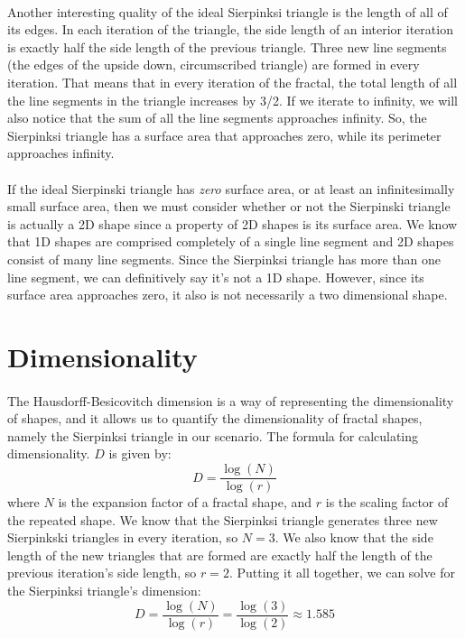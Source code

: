 \documentclass{article}
\begin{document}
\paragraph{}
Another interesting quality of the ideal Sierpinksi triangle is the length of all of its edges. In each iteration of the triangle, the side length of an interior iteration is exactly half the side length of the previous triangle. Three new line segments (the edges of the upside down, circumscribed triangle) are formed in every iteration. That means that in every iteration of the fractal, the total length of all the line segments in the triangle increases by 3/2. If we iterate to infinity, we will also notice that the sum of all the line segments approaches infinity. So, the Sierpinksi triangle has a surface area that approaches zero, while its perimeter approaches infinity.
\paragraph{}
If the ideal Sierpinski triangle has \textit{zero} surface area, or at least an infinitesimally small surface area, then we must consider whether or not the Sierpinski triangle is actually a 2D shape since a property of 2D shapes is its surface area. We know that 1D shapes are comprised completely of a single line segment and 2D shapes consist of many line segments. Since the Sierpinksi triangle has more than one line segment, we can definitively say it's not a 1D shape. However, since its surface area approaches zero, it also is not necessarily a two dimensional shape.
\section*{Dimensionality}
\paragraph{}
The Hausdorff-Besicovitch dimension is a way of representing the dimensionality of shapes, and it allows us to quantify the dimensionality of fractal shapes, namely the Sierpinksi triangle in our scenario. The formula for calculating dimensionality. \(D\) is given by:
\[D = \frac{\log(N)}{\log(r)} \]
where \(N\) is the expansion factor of a fractal shape, and \(r\) is the scaling factor of the repeated shape. We know that the Sierpinksi triangle generates three new Sierpinkski triangles in every iteration, so \(N=3\). We also know that the side length of the new triangles that are formed are exactly half the length of the previous iteration's side length, so \(r=2\). Putting it all together, we can solve for the Sierpinksi triangle's dimension:
\[D = \frac{\log(N)}{\log(r)} = \frac{\log(3)}{\log(2)} \approx 1.585\]
\end{document}
